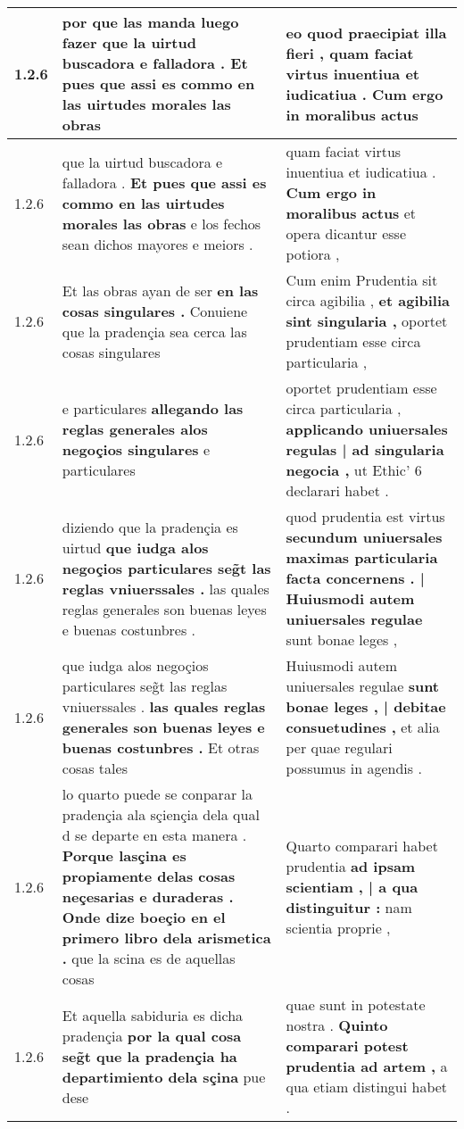 \begin{tabular}{|p{1cm}|p{6.5cm}|p{6.5cm}|}
1.2.6 & por que las manda luego fazer \textbf{ que la uirtud buscadora e falladora . } Et pues que assi es commo en las uirtudes morales las obras & eo quod praecipiat illa fieri , \textbf{ quam faciat virtus inuentiua et iudicatiua . } Cum ergo in moralibus actus \\\hline
1.2.6 & que la uirtud buscadora e falladora . \textbf{ Et pues que assi es commo en las uirtudes morales las obras } e los fechos sean dichos mayores e meiors . & quam faciat virtus inuentiua et iudicatiua . \textbf{ Cum ergo in moralibus actus } et opera dicantur esse potiora , \\\hline
1.2.6 & Et las obras ayan de ser \textbf{ en las cosas singulares . } Conuiene que la pradençia sea cerca las cosas singulares & Cum enim Prudentia sit circa agibilia , \textbf{ et agibilia sint singularia , } oportet prudentiam esse circa particularia , \\\hline
1.2.6 & e particulares \textbf{ allegando las reglas generales alos negoçios singulares } e particulares & oportet prudentiam esse circa particularia , \textbf{ applicando uniuersales regulas | ad singularia negocia , } ut Ethic’ 6 declarari habet . \\\hline
1.2.6 & diziendo que la pradençia es uirtud \textbf{ que iudga alos negoçios particulares seg̃t las reglas vniuerssales . } las quales reglas generales son buenas leyes e buenas costunbres . & quod prudentia est virtus \textbf{ secundum uniuersales maximas particularia facta concernens . | Huiusmodi autem uniuersales regulae } sunt bonae leges , \\\hline
1.2.6 & que iudga alos negoçios particulares seg̃t las reglas vniuerssales . \textbf{ las quales reglas generales son buenas leyes e buenas costunbres . } Et otras cosas tales & Huiusmodi autem uniuersales regulae \textbf{ sunt bonae leges , | debitae consuetudines , } et alia per quae regulari possumus in agendis . \\\hline
1.2.6 & lo quarto puede se conparar la pradençia ala sçiençia dela qual d se departe en esta manera . \textbf{ Porque lasçina es propiamente delas cosas neçesarias e duraderas . Onde dize boeçio en el primero libro dela arismetica . } que la scina es de aquellas cosas & Quarto comparari habet prudentia \textbf{ ad ipsam scientiam , | a qua distinguitur : } nam scientia proprie , \\\hline
1.2.6 & Et aquella sabiduria es dicha pradençia \textbf{ por la qual cosa seg̃t que la pradençia ha departimiento dela sçina } pue dese & quae sunt in potestate nostra . \textbf{ Quinto comparari potest prudentia ad artem , } a qua etiam distingui habet . \\\hline

\end{tabular}
